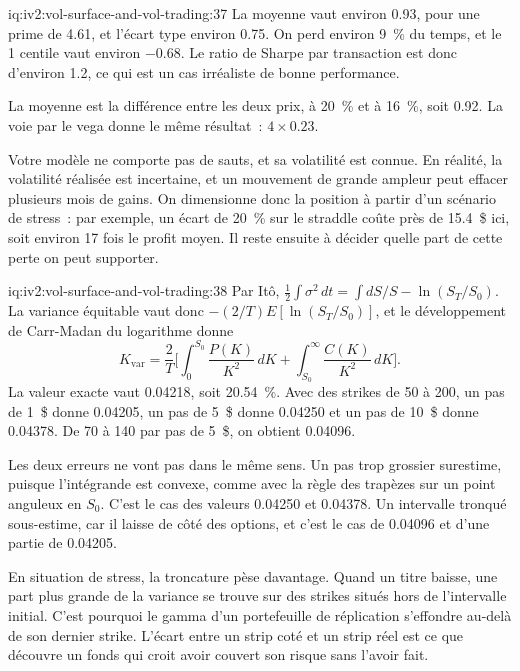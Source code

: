 \begin{solution}{iq:iv2:vol-surface-and-vol-trading:37}
La moyenne vaut environ 0.93, pour une prime de 4.61, et l'écart type environ 0.75. On perd environ 9~\% du temps, et le 1 centile vaut environ $-0.68$. Le ratio de Sharpe par transaction est donc d'environ 1.2, ce qui est un cas irréaliste de bonne performance.

La moyenne est la différence entre les deux prix, à 20~\% et à 16~\%, soit 0.92. La voie par le vega donne le même résultat~: $4 \times 0.23$.

Votre modèle ne comporte pas de sauts, et sa volatilité est connue. En réalité, la volatilité réalisée est incertaine, et un mouvement de grande ampleur peut effacer plusieurs mois de gains. On dimensionne donc la position à partir d'un scénario de stress~: par exemple, un écart de 20~\% sur le straddle coûte près de 15.4~\$ ici, soit environ 17 fois le profit moyen. Il reste ensuite à décider quelle part de cette perte on peut supporter.

\end{solution}

\begin{solution}{iq:iv2:vol-surface-and-vol-trading:38}
Par Itô, $\tfrac12\int\sigma^2\,dt = \int dS/S - \ln(S_T/S_0)$. La variance équitable vaut donc $-(2/T)E[\ln(S_T/S_0)]$, et le développement de Carr-Madan du logarithme donne
\[
K_{\text{var}} = \frac2T\Big[\int_0^{S_0}\frac{P(K)}{K^2}\,dK + \int_{S_0}^\infty\frac{C(K)}{K^2}\,dK\Big].
\]
La valeur exacte vaut 0.04218, soit 20.54~\%. Avec des strikes de 50 à 200, un pas de 1~\$ donne 0.04205, un pas de 5~\$ donne 0.04250 et un pas de 10~\$ donne 0.04378. De 70 à 140 par pas de 5~\$, on obtient 0.04096.

Les deux erreurs ne vont pas dans le même sens. Un pas trop grossier surestime, puisque l'intégrande est convexe, comme avec la règle des trapèzes sur un point anguleux en $S_0$. C'est le cas des valeurs 0.04250 et 0.04378. Un intervalle tronqué sous-estime, car il laisse de côté des options, et c'est le cas de 0.04096 et d'une partie de 0.04205.

En situation de stress, la troncature pèse davantage. Quand un titre baisse, une part plus grande de la variance se trouve sur des strikes situés hors de l'intervalle initial. C'est pourquoi le gamma d'un portefeuille de réplication s'effondre au-delà de son dernier strike. L'écart entre un strip coté et un strip réel est ce que découvre un fonds qui croit avoir couvert son risque sans l'avoir fait.

\end{solution}

